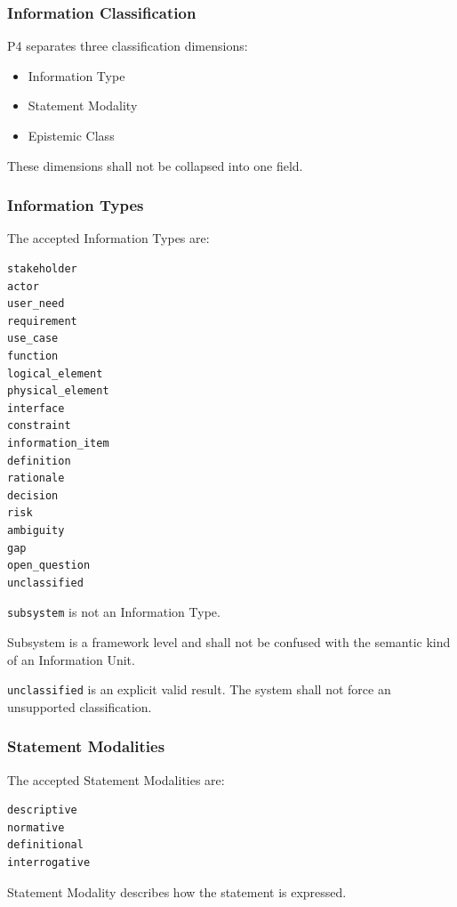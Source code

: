 \hypertarget{information-classification}{%
\subsubsection{Information Classification}\label{information-classification}}

P4 separates three classification dimensions:

\begin{itemize}
\tightlist
\item
  Information Type
\item
  Statement Modality
\item
  Epistemic Class
\end{itemize}

These dimensions shall not be collapsed into one field.

\hypertarget{information-types}{%
\subsubsection{Information Types}\label{information-types}}

The accepted Information Types are:

\begin{verbatim}
stakeholder
actor
user_need
requirement
use_case
function
logical_element
physical_element
interface
constraint
information_item
definition
rationale
decision
risk
ambiguity
gap
open_question
unclassified
\end{verbatim}

\texttt{subsystem} is not an Information Type.

Subsystem is a framework level and shall not be confused with the semantic kind of an Information Unit.

\texttt{unclassified} is an explicit valid result. The system shall not force an unsupported classification.

\hypertarget{statement-modalities}{%
\subsubsection{Statement Modalities}\label{statement-modalities}}

The accepted Statement Modalities are:

\begin{verbatim}
descriptive
normative
definitional
interrogative
\end{verbatim}

Statement Modality describes how the statement is expressed.

